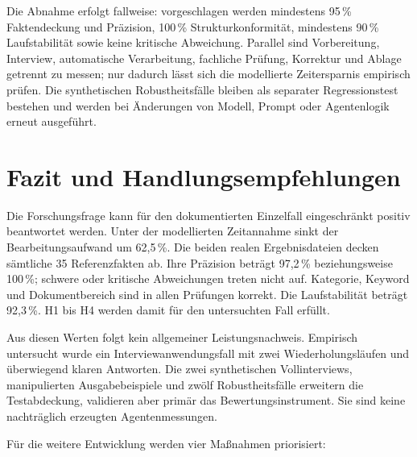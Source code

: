 \documentclass[
  10pt,
  ngerman,
  a4paper,
  toc=graduated,
  numbers=noenddot,
  headings=standardclasses,
  nonumberlist
]{scrartcl}
\newcommand{\pct}[1]{#1\,\%}
\begin{document}
Die Abnahme erfolgt fallweise: vorgeschlagen werden mindestens \pct{95} Faktendeckung und Präzision, \pct{100} Strukturkonformität, mindestens \pct{90} Laufstabilität sowie keine kritische Abweichung. Parallel sind Vorbereitung, Interview, automatische Verarbeitung, fachliche Prüfung, Korrektur und Ablage getrennt zu messen; nur dadurch lässt sich die modellierte Zeitersparnis empirisch prüfen. Die synthetischen Robustheitsfälle bleiben als separater Regressionstest bestehen und werden bei Änderungen von Modell, Prompt oder Agentenlogik erneut ausgeführt.

\section{Fazit und Handlungsempfehlungen}

Die Forschungsfrage kann für den dokumentierten Einzelfall eingeschränkt positiv beantwortet werden. Unter der modellierten Zeitannahme sinkt der Bearbeitungsaufwand um \pct{62{,}5}. Die beiden realen Ergebnisdateien decken sämtliche 35 Referenzfakten ab. Ihre Präzision beträgt \pct{97{,}2} beziehungsweise \pct{100}; schwere oder kritische Abweichungen treten nicht auf. Kategorie, Keyword und Dokumentbereich sind in allen Prüfungen korrekt. Die Laufstabilität beträgt \pct{92{,}3}. H1 bis H4 werden damit für den untersuchten Fall erfüllt.

Aus diesen Werten folgt kein allgemeiner Leistungsnachweis. Empirisch untersucht wurde ein Interviewanwendungsfall mit zwei Wiederholungsläufen und überwiegend klaren Antworten. Die zwei synthetischen Vollinterviews, manipulierten Ausgabebeispiele und zwölf Robustheitsfälle erweitern die Testabdeckung, validieren aber primär das Bewertungsinstrument. Sie sind keine nachträglich erzeugten Agentenmessungen.

Für die weitere Entwicklung werden vier Maßnahmen priorisiert:
\end{document}
